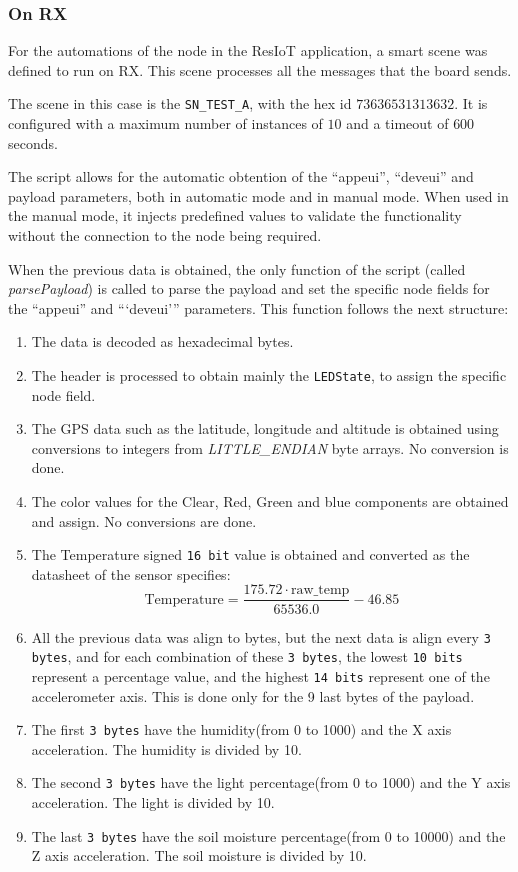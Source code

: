 \subsubsection*{On RX}
For the automations of the node in the ResIoT application, a smart scene was defined to run on RX. This scene processes all the messages that the board sends.

The scene in this case is the \texttt{SN\_TEST\_A}, with the hex id $73636531313632$. It is configured with a maximum number of instances of $10$ and a timeout of $600$ seconds.

The script allows for the automatic obtention of the ``appeui'', ``deveui'' and payload parameters, both in automatic mode and in manual mode. When used in the manual mode, it injects 
predefined values to validate the functionality without the connection to the node being required.

When the previous data is obtained, the only function of the script (called \textit{parsePayload}) is called to parse the payload and set the specific node fields for the ``appeui'' and ```deveui''' parameters. This function follows the next structure:
\begin{enumerate}
    \item The data is decoded as hexadecimal bytes.
    \item The header is processed to obtain mainly the \texttt{LEDState}, to assign the specific node field.
    \item The GPS data such as the latitude, longitude and altitude is obtained using conversions to integers from \textit{LITTLE\_ENDIAN} byte arrays. No conversion is done.
    \item The color values for the Clear, Red, Green and blue components are obtained and assign. No conversions are done.
    \item The Temperature signed \texttt{16 bit} value is obtained and converted as the datasheet of the sensor specifies\cite{Support_Documents_TechnicalDocs_Si7021A20}:
    \[
    \text{Temperature} = \frac{175.72 \cdot \text{raw\_temp}}{65536.0} - 46.85
    \]
    \item All the previous data was align to bytes, but the next data is align every \texttt{3 bytes}, and for each combination of these \texttt{3 bytes}, the lowest \texttt{10 bits} represent a percentage value, and the highest \texttt{14 bits} represent one of the accelerometer axis. This is done only for the 9 last bytes of the payload.
    \item The first \texttt{3 bytes} have the humidity(from 0 to 1000) and the X axis acceleration. The humidity is divided by 10.
    \item The second \texttt{3 bytes} have the light percentage(from 0 to 1000) and the Y axis acceleration. The light is divided by 10.
    \item The last \texttt{3 bytes} have the soil moisture percentage(from 0 to 10000) and the Z axis acceleration. The soil moisture is divided by 10.
\end{enumerate}

